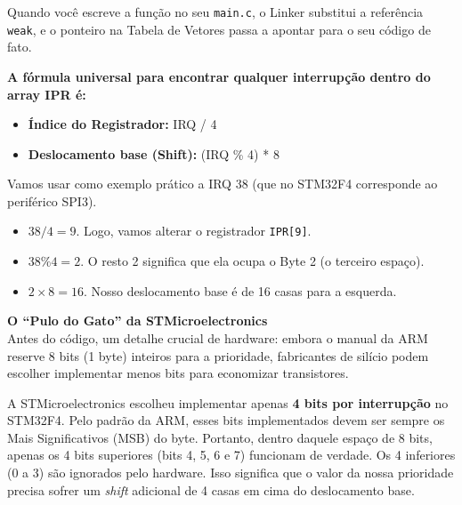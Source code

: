 \documentclass[12pt,a4paper]{article}
\begin{document}
Quando você escreve a função no seu \texttt{main.c}, o Linker substitui a referência \texttt{weak}, e o ponteiro na Tabela de Vetores passa a apontar para o seu código de fato.

\textbf{A fórmula universal para encontrar qualquer interrupção dentro do array IPR é:}
\begin{itemize}
    \item \textbf{Índice do Registrador:} IRQ / 4
    \item \textbf{Deslocamento base (Shift):} (IRQ \% 4) * 8
\end{itemize}

Vamos usar como exemplo prático a IRQ 38 (que no STM32F4 corresponde ao periférico SPI3).
\begin{itemize}
    \item $38 / 4 = 9$. Logo, vamos alterar o registrador \texttt{IPR[9]}.
    \item $38 \% 4 = 2$. O resto 2 significa que ela ocupa o Byte 2 (o terceiro espaço).
    \item $2 \times 8 = 16$. Nosso deslocamento base é de 16 casas para a esquerda.
\end{itemize}

\textbf{O ``Pulo do Gato'' da STMicroelectronics}\\
Antes do código, um detalhe crucial de hardware: embora o manual da ARM reserve 8 bits (1 byte) inteiros para a prioridade, fabricantes de silício podem escolher implementar menos bits para economizar transistores.

A STMicroelectronics escolheu implementar apenas \textbf{4 bits por interrupção} no STM32F4. Pelo padrão da ARM, esses bits implementados devem ser sempre os Mais Significativos (MSB) do byte. Portanto, dentro daquele espaço de 8 bits, apenas os 4 bits superiores (bits 4, 5, 6 e 7) funcionam de verdade. Os 4 inferiores (0 a 3) são ignorados pelo hardware.
Isso significa que o valor da nossa prioridade precisa sofrer um \textit{shift} adicional de 4 casas em cima do deslocamento base.
\end{document}
